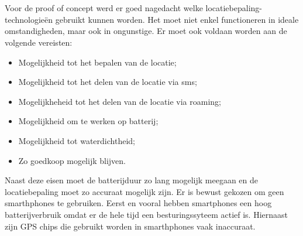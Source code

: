 \chapter{}
\label{ch:vergelijking}
Voor de proof of concept werd er goed nagedacht welke locatiebepaling-technologieën gebruikt kunnen worden. Het moet niet enkel functioneren in ideale omstandigheden, maar ook in ongunstige. Er moet ook voldaan worden aan de volgende vereisten:
\begin{itemize}
    \item Mogelijkheid tot het bepalen van de locatie;
    \item Mogelijkheid tot het delen van de locatie via sms;
    \item Mogelijkheheid tot het delen van de locatie via roaming;
    \item Mogelijkheid om te werken op batterij;
    \item Mogelijkheid tot waterdichtheid;
    \item Zo goedkoop mogelijk blijven.
\end{itemize}
Naast deze eisen moet de batterijduur zo lang mogelijk meegaan en de locatiebepaling moet zo accuraat mogelijk zijn.
\newline
Er is bewust gekozen om geen smarthphones te gebruiken. Eerst en vooral hebben smartphones een hoog batterijverbruik omdat er de hele tijd een besturingssyteem actief is. Hiernaast zijn GPS chips die gebruikt worden in smarthphones vaak inaccuraat.
\newline
